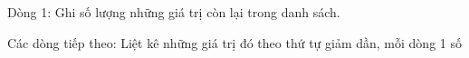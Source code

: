 Dòng 1: Ghi số lượng những giá trị còn lại trong danh sách.  

   Các dòng tiếp theo: Liệt kê những giá trị đó theo thứ tự giảm dần, mỗi dòng 1 số  

\
